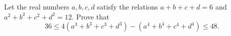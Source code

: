 Let the real numbers $a, b, c, d$ satisfy the relations $a+b+c+d=6$ and $a^2+b^2+c^2+d^2=12$. Prove that
\[
36 \leq 4(a^3+b^3+c^3+d^3) - (a^4+b^4+c^4+d^4) \leq 48.
\]
